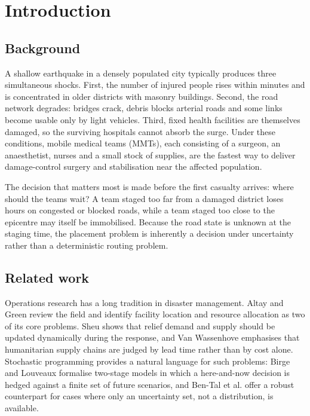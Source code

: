 \documentclass{apmcmthesis}
\begin{document}
\newpage
\pagestyle{mainmatterstyle}
\setcounter{page}{1}

\section{Introduction}

\subsection{Background}

A shallow earthquake in a densely populated city typically produces three simultaneous shocks. First, the number of injured people rises within minutes and is concentrated in older districts with masonry buildings. Second, the road network degrades: bridges crack, debris blocks arterial roads and some links become usable only by light vehicles. Third, fixed health facilities are themselves damaged, so the surviving hospitals cannot absorb the surge. Under these conditions, mobile medical teams (MMTs), each consisting of a surgeon, an anaesthetist, nurses and a small stock of supplies, are the fastest way to deliver damage-control surgery and stabilisation near the affected population.

The decision that matters most is made before the first casualty arrives: where should the teams wait? A team staged too far from a damaged district loses hours on congested or blocked roads, while a team staged too close to the epicentre may itself be immobilised. Because the road state is unknown at the staging time, the placement problem is inherently a decision under uncertainty rather than a deterministic routing problem.

\subsection{Related work}

Operations research has a long tradition in disaster management. Altay and Green \cite{altay2006} review the field and identify facility location and resource allocation as two of its core problems. Sheu \cite{sheu2010} shows that relief demand and supply should be updated dynamically during the response, and Van Wassenhove \cite{vanwassenhove2006} emphasises that humanitarian supply chains are judged by lead time rather than by cost alone. Stochastic programming provides a natural language for such problems: Birge and Louveaux \cite{birge2011} formalise two-stage models in which a here-and-now decision is hedged against a finite set of future scenarios, and Ben-Tal et al. \cite{bental2009} offer a robust counterpart for cases where only an uncertainty set, not a distribution, is available.
\end{document}
